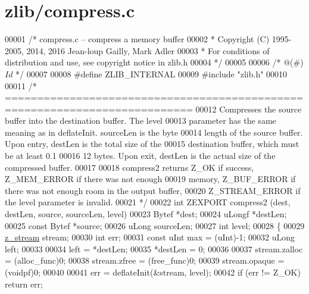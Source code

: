 \hypertarget{zlib_2compress_8c_source}{}\section{zlib/compress.c}
\label{zlib_2compress_8c_source}

\begin{DoxyCode}
00001 \textcolor{comment}{/* compress.c -- compress a memory buffer}
00002 \textcolor{comment}{ * Copyright (C) 1995-2005, 2014, 2016 Jean-loup Gailly, Mark Adler}
00003 \textcolor{comment}{ * For conditions of distribution and use, see copyright notice in zlib.h}
00004 \textcolor{comment}{ */}
00005 
00006 \textcolor{comment}{/* @(#) $Id$ */}
00007 
00008 \textcolor{preprocessor}{#define ZLIB\_INTERNAL}
00009 \textcolor{preprocessor}{#include "zlib.h"}
00010 
00011 \textcolor{comment}{/* ===========================================================================}
00012 \textcolor{comment}{     Compresses the source buffer into the destination buffer. The level}
00013 \textcolor{comment}{   parameter has the same meaning as in deflateInit.  sourceLen is the byte}
00014 \textcolor{comment}{   length of the source buffer. Upon entry, destLen is the total size of the}
00015 \textcolor{comment}{   destination buffer, which must be at least 0.1%
00016 \textcolor{comment}{   12 bytes. Upon exit, destLen is the actual size of the compressed buffer.}
00017 \textcolor{comment}{}
00018 \textcolor{comment}{     compress2 returns Z\_OK if success, Z\_MEM\_ERROR if there was not enough}
00019 \textcolor{comment}{   memory, Z\_BUF\_ERROR if there was not enough room in the output buffer,}
00020 \textcolor{comment}{   Z\_STREAM\_ERROR if the level parameter is invalid.}
00021 \textcolor{comment}{*/}
00022 \textcolor{keywordtype}{int} ZEXPORT compress2 (dest, destLen, source, sourceLen, level)
00023     Bytef *dest;
00024     uLongf *destLen;
00025     \textcolor{keyword}{const} Bytef *source;
00026     uLong sourceLen;
00027     \textcolor{keywordtype}{int} level;
00028 \{
00029     \hyperlink{structz__stream__s}{z\_stream} stream;
00030     \textcolor{keywordtype}{int} err;
00031     \textcolor{keyword}{const} uInt max = (uInt)-1;
00032     uLong left;
00033 
00034     left = *destLen;
00035     *destLen = 0;
00036 
00037     stream.zalloc = (alloc\_func)0;
00038     stream.zfree = (free\_func)0;
00039     stream.opaque = (voidpf)0;
00040 
00041     err = deflateInit(&stream, level);
00042     \textcolor{keywordflow}{if} (err != Z\_OK) \textcolor{keywordflow}{return} err;
}
\end{DoxyCode}

